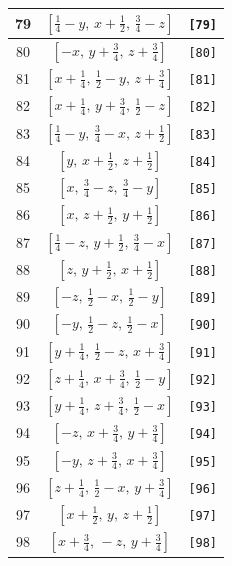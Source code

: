 \documentclass[fleqn,8pt]{jsarticle}
\begin{document}
\begin{longtable}{ccc}
79 & $\left[ \frac{1}{4} - y,\, x + \frac{1}{2},\, \frac{3}{4} - z \right]$ & {\tt [79]} \\ \hline
80 & $\left[ - x,\, y + \frac{3}{4},\, z + \frac{3}{4} \right]$ & {\tt [80]} \\ \hline
81 & $\left[ x + \frac{1}{4},\, \frac{1}{2} - y,\, z + \frac{3}{4} \right]$ & {\tt [81]} \\ \hline
82 & $\left[ x + \frac{1}{4},\, y + \frac{3}{4},\, \frac{1}{2} - z \right]$ & {\tt [82]} \\ \hline
83 & $\left[ \frac{1}{4} - y,\, \frac{3}{4} - x,\, z + \frac{1}{2} \right]$ & {\tt [83]} \\ \hline
84 & $\left[ y,\, x + \frac{1}{2},\, z + \frac{1}{2} \right]$ & {\tt [84]} \\ \hline
85 & $\left[ x,\, \frac{3}{4} - z,\, \frac{3}{4} - y \right]$ & {\tt [85]} \\ \hline
86 & $\left[ x,\, z + \frac{1}{2},\, y + \frac{1}{2} \right]$ & {\tt [86]} \\ \hline
87 & $\left[ \frac{1}{4} - z,\, y + \frac{1}{2},\, \frac{3}{4} - x \right]$ & {\tt [87]} \\ \hline
88 & $\left[ z,\, y + \frac{1}{2},\, x + \frac{1}{2} \right]$ & {\tt [88]} \\ \hline
89 & $\left[ - z,\, \frac{1}{2} - x,\, \frac{1}{2} - y \right]$ & {\tt [89]} \\ \hline
90 & $\left[ - y,\, \frac{1}{2} - z,\, \frac{1}{2} - x \right]$ & {\tt [90]} \\ \hline
91 & $\left[ y + \frac{1}{4},\, \frac{1}{2} - z,\, x + \frac{3}{4} \right]$ & {\tt [91]} \\ \hline
92 & $\left[ z + \frac{1}{4},\, x + \frac{3}{4},\, \frac{1}{2} - y \right]$ & {\tt [92]} \\ \hline
93 & $\left[ y + \frac{1}{4},\, z + \frac{3}{4},\, \frac{1}{2} - x \right]$ & {\tt [93]} \\ \hline
94 & $\left[ - z,\, x + \frac{3}{4},\, y + \frac{3}{4} \right]$ & {\tt [94]} \\ \hline
95 & $\left[ - y,\, z + \frac{3}{4},\, x + \frac{3}{4} \right]$ & {\tt [95]} \\ \hline
96 & $\left[ z + \frac{1}{4},\, \frac{1}{2} - x,\, y + \frac{3}{4} \right]$ & {\tt [96]} \\ \hline
97 & $\left[ x + \frac{1}{2},\, y,\, z + \frac{1}{2} \right]$ & {\tt [97]} \\ \hline
98 & $\left[ x + \frac{3}{4},\, - z,\, y + \frac{3}{4} \right]$ & {\tt [98]} \\ \hline

\end{longtable}
\end{document}
